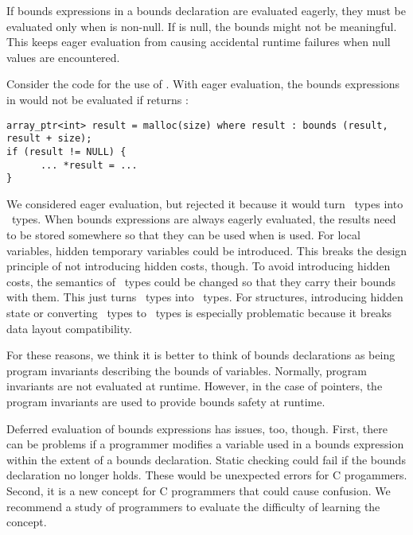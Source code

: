 If bounds expressions in a bounds declaration  are evaluated 
eagerly, they must  be evaluated only when  is non-null. If  is null,
the bounds might not be meaningful.  This keeps eager evaluation from
causing accidental runtime failures when null values are encountered.    

Consider the code for the use of .   With eager evaluation,
the bounds expressions in  would not
be evaluated if  returns :
\begin{lstlisting}
array_ptr<int> result = malloc(size) where result : bounds (result, result + size);
if (result != NULL) {
      ... *result = ...
}
\end{lstlisting}

We considered eager evaluation, but rejected it because it would turn \arrayptr\
types into \spanptr\ types.  When bounds expressions are always eagerly
evaluated, the results need to be stored somewhere so that they can be used
when \var{v} is used.  For local variables, hidden temporary variables could be
introduced.  This breaks the design principle of not introducing hidden
costs, though.  To avoid introducing hidden costs, the semantics of \arrayptr\ types could 
be changed so that they carry their bounds with them.   This just turns \arrayptr\ types into 
\spanptr\ types.   For structures, introducing hidden state or converting \arrayptr\ types to 
\spanptr\ types is especially problematic because it breaks data layout compatibility.

For these reasons, we think it is better to think of bounds declarations as being
program invariants describing the bounds of variables.   Normally, 
program invariants are not evaluated at runtime.  However, in the case of pointers,
the program invariants are used to provide bounds safety at runtime.

Deferred evaluation of bounds expressions has issues, too, though. First, there
can be problems if a programmer modifies a variable used in a bounds expression
within the extent of a bounds declaration.  Static checking could fail if the
bounds declaration no longer holds.  These would be unexpected errors for
C progammers.  Second, it is a new concept for C programmers that could
cause confusion.  We recommend a study of
programmers to evaluate the difficulty of learning the concept.


